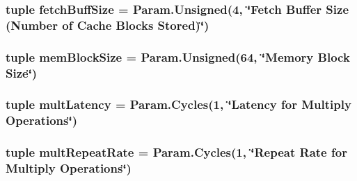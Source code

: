 \label{classInOrderCPU_1_1InOrderCPU_a736a65eafa168f467a9a36e107b331e6}
\hypertarget{classInOrderCPU_1_1InOrderCPU_acf6ecee886e4ec3d3d5d5a716ba9769c}{
\subsubsection[{fetchBuffSize}]{\setlength{\rightskip}{0pt plus 5cm}tuple {\bf fetchBuffSize} = Param.Unsigned(4, \char`\"{}Fetch {\bf Buffer} Size (Number of {\bf Cache} Blocks Stored)\char`\"{})}}
\label{classInOrderCPU_1_1InOrderCPU_acf6ecee886e4ec3d3d5d5a716ba9769c}
\hypertarget{classInOrderCPU_1_1InOrderCPU_a6032108902ed2f0fd6f442b6e55201e1}{
\subsubsection[{memBlockSize}]{\setlength{\rightskip}{0pt plus 5cm}tuple {\bf memBlockSize} = Param.Unsigned(64, \char`\"{}Memory Block Size\char`\"{})}}
\label{classInOrderCPU_1_1InOrderCPU_a6032108902ed2f0fd6f442b6e55201e1}
\hypertarget{classInOrderCPU_1_1InOrderCPU_afcda6c29d525f6eee0250f9e88ad6f62}{
\subsubsection[{multLatency}]{\setlength{\rightskip}{0pt plus 5cm}tuple {\bf multLatency} = Param.Cycles(1, \char`\"{}Latency for Multiply Operations\char`\"{})}}
\label{classInOrderCPU_1_1InOrderCPU_afcda6c29d525f6eee0250f9e88ad6f62}
\hypertarget{classInOrderCPU_1_1InOrderCPU_a9bc688118111286e54b0856ba347ec12}{
\subsubsection[{multRepeatRate}]{\setlength{\rightskip}{0pt plus 5cm}tuple {\bf multRepeatRate} = Param.Cycles(1, \char`\"{}Repeat Rate for Multiply Operations\char`\"{})}}
